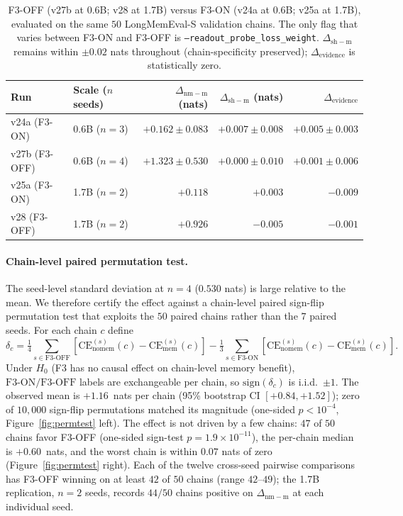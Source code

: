 \documentclass{article}
\newcommand{\dnm}{\Delta_{\mathrm{nm-m}}}
\newcommand{\dsh}{\Delta_{\mathrm{sh-m}}}
\newcommand{\CEmem}{\mathrm{CE}_{\mathrm{mem}}}
\newcommand{\CEnomem}{\mathrm{CE}_{\mathrm{nomem}}}
\newcommand{\elift}{\Delta_{\mathrm{evidence}}}
\begin{document}
\begin{table}[t]
\centering
\caption{F3-OFF (v27b at 0.6B; v28 at 1.7B) versus F3-ON (v24a at
0.6B; v25a at 1.7B), evaluated on the same $50$ LongMemEval-S
validation chains.  The only flag that varies between F3-ON and
F3-OFF is \texttt{--readout\_probe\_loss\_weight}.  $\dsh$ remains
within $\pm 0.02$ nats throughout (chain-specificity preserved);
$\elift$ is statistically zero.}
\label{tab:f3_off}
\small
\begin{tabular}{llrrr}
\toprule
Run & Scale ($n$ seeds) & $\dnm$ (nats) & $\dsh$ (nats) & $\elift$ \\
\midrule
v24a (F3-ON)  & 0.6B ($n=3$) & $+0.162 \pm 0.083$ & $+0.007 \pm 0.008$ & $+0.005 \pm 0.003$ \\
v27b (F3-OFF) & 0.6B ($n=4$) & $+1.323 \pm 0.530$ & $+0.000 \pm 0.010$ & $+0.001 \pm 0.006$ \\
\midrule
v25a (F3-ON)  & 1.7B ($n=2$) & $+0.118$           & $+0.003$           & $-0.009$           \\
v28  (F3-OFF) & 1.7B ($n=2$) & $+0.926$           & $-0.005$           & $-0.001$           \\
\bottomrule
\end{tabular}
\end{table}

\paragraph{Chain-level paired permutation test.}
The seed-level standard deviation at $n=4$ ($0.530$ nats) is large
relative to the mean.  We therefore certify the effect against a
chain-level paired sign-flip permutation test that exploits the
$50$ paired chains rather than the $7$ paired seeds.  For each chain
$c$ define
\begin{equation*}
\delta_c = \tfrac{1}{4}\!\sum_{s \in \mathrm{F3\text{-}OFF}}\!\!\!\!
[\CEnomem^{(s)}\!(c) - \CEmem^{(s)}\!(c)]
        - \tfrac{1}{3}\!\sum_{s \in \mathrm{F3\text{-}ON}}\!\!\!\!
[\CEnomem^{(s)}\!(c) - \CEmem^{(s)}\!(c)] .
\end{equation*}
Under $H_0$ (F3 has no causal effect on chain-level memory benefit),
$\mathrm{F3\text{-}ON}/\mathrm{F3\text{-}OFF}$ labels are exchangeable
per chain, so $\mathrm{sign}(\delta_c)$ is i.i.d.\ $\pm 1$.  The
observed mean is $+1.16$~nats per chain (95\% bootstrap CI
$[+0.84, +1.52]$); zero of $10{,}000$ sign-flip permutations matched
its magnitude (one-sided $p < 10^{-4}$, Figure~\ref{fig:permtest}
left).  The effect is not driven by a few chains: $47$ of $50$
chains favor F3-OFF (one-sided sign-test $p = 1.9\times10^{-11}$),
the per-chain median is $+0.60$~nats, and the worst chain is within
$0.07$ nats of zero (Figure~\ref{fig:permtest} right).  Each of the
twelve cross-seed pairwise comparisons has F3-OFF winning on at
least $42$ of $50$ chains (range $42$--$49$); the 1.7B replication,
$n=2$ seeds, records $44/50$ chains positive on $\dnm$ at each
individual seed.
\end{document}
